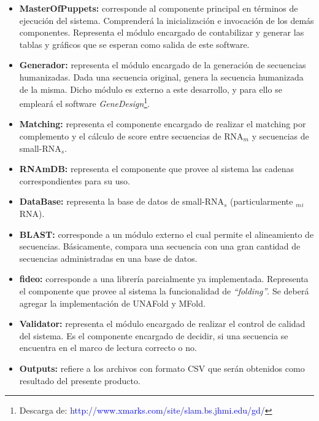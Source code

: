 \documentclass[12pt,a4paper,spanish]{article}
\begin{document}
\begin{itemize}
  \item \textbf{MasterOfPuppets:} corresponde al componente principal en términos de ejecución del sistema. Comprenderá
  la inicialización e invocación de los demás componentes. Representa el módulo encargado de contabilizar y generar 
  las tablas y gráficos que se esperan como salida de este software.

  \item \textbf{Generador:} representa el módulo encargado de la generación de secuencias humanizadas. Dada una 		 
  secuencia original, genera la secuencia humanizada de la misma. Dicho módulo es externo a este desarrollo, y para ello  
  se empleará el software \emph{GeneDesign}\footnote{Descarga de: 
  \textcolor{blue}{http://www.xmarks.com/site/slam.bs.jhmi.edu/gd/}}.

  \item \textbf{Matching:} representa el componente encargado de realizar el matching por complemento y el cálculo de 	 
  score entre secuencias de RNA$_m$ y secuencias de small-RNA$_s$. 

  \item \textbf{RNAmDB:} representa el componente que provee al sistema las cadenas correspondientes para su uso.

  \item \textbf{DataBase:} representa la base de datos de small-RNA$_s$ (particularmente $_m$$_i$RNA).

  \item \textbf{BLAST:} corresponde a un módulo externo el cual permite el alineamiento de secuencias. Básicamente, 	 
  compara una secuencia con una gran cantidad de secuencias administradas en una base de datos.

  \item \textbf{fideo:} corresponde a una librería parcialmente ya implementada. Representa el componente que provee al
  sistema la funcionalidad de \emph{``folding''}. Se deberá agregar la implementación de \textsf{UNAFold} y \textsf{MFold}.

  \item \textbf{Validator:} representa el módulo encargado de realizar el control de calidad del sistema. Es el componente 	 encargado de decidir, si una secuencia se encuentra en el marco de lectura correcto o no.

  \item \textbf{Outputs:} refiere a los archivos con formato \textsf{CSV} que serán obtenidos como resultado del presente producto.
 
\end{itemize}
\end{document}
